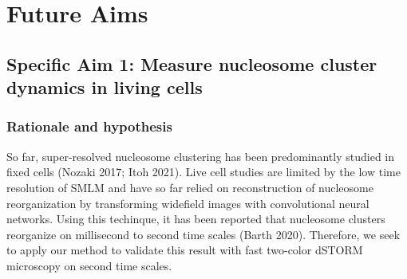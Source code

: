 \documentclass{ucetd}
\begin{document}

\section{Future Aims}

\subsection{Specific Aim 1: Measure nucleosome cluster dynamics in living cells}

\subsubsection{Rationale and hypothesis}

So far, super-resolved nucleosome clustering has been predominantly studied in fixed cells (Nozaki 2017; Itoh 2021). Live cell studies are limited by the low time resolution of SMLM and have so far relied on reconstruction of nucleosome reorganization by transforming widefield images with convolutional neural networks. Using this techinque, it has been reported that nucleosome clusters reorganize on millisecond to second time scales (Barth 2020).  Therefore, we seek to apply our method to validate this result with fast two-color dSTORM microscopy on second time scales. 
\end{document}
